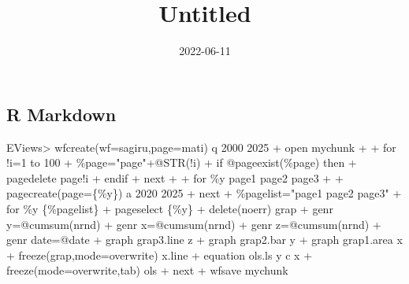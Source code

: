 \documentclass[
]{article}
\title{Untitled}
\author{}
\date{\vspace{-2.5em}2022-06-11}
\newenvironment{Shaded}{\begin{snugshade}}{\end{snugshade}}
\newcommand{\FunctionTok}[1]{\textcolor[rgb]{0.00,0.00,0.00}{#1}}
\newcommand{\NormalTok}[1]{#1}
\newcommand{\SpecialCharTok}[1]{\textcolor[rgb]{0.00,0.00,0.00}{#1}}
\begin{document}
\maketitle

{
\setcounter{tocdepth}{2}
\tableofcontents
}
\hypertarget{r-markdown}{%
\subsection{R Markdown}\label{r-markdown}}

\begin{Shaded}
\begin{Highlighting}[]
\NormalTok{EViews\textgreater{} wfcreate(wf=sagiru,page=mati) q 2000 2025}
\NormalTok{+ \textquotesingle{}open mychunk}
\NormalTok{+ }
\NormalTok{+ for !i=1 to 100}
\NormalTok{+ \%page="page"+@STR(!i)}
\NormalTok{+ if @pageexist(\%page) then}
\NormalTok{+ pagedelete page!i}
\NormalTok{+ endif}
\NormalTok{+ next}
\NormalTok{+ }
\NormalTok{+ for \%y page1 page2 page3  }
\NormalTok{+ }
\NormalTok{+ pagecreate(page=\{\%y\}) a 2020 2025}
\NormalTok{+ next}
\NormalTok{+ \%pagelist="page1 page2 page3"}
\NormalTok{+ for \%y \{\%pagelist\}}
\NormalTok{+ pageselect \{\%y\}}
\NormalTok{+ delete(noerr) grap}
\NormalTok{+ genr y=@cumsum(nrnd)}
\NormalTok{+ genr x=@cumsum(nrnd)}
\NormalTok{+ genr z=@cumsum(nrnd)}
\NormalTok{+ genr date=@date}
\NormalTok{+ \textquotesingle{}  graph grap3.line z   }
\NormalTok{+  \textquotesingle{}             graph grap2.bar y }
\NormalTok{+   \textquotesingle{}                        graph grap1.area x  }
\NormalTok{+    \textquotesingle{} freeze(grap,mode=overwrite) x.line}
\NormalTok{+ equation ols.ls y c x}
\NormalTok{+ freeze(mode=overwrite,tab) ols}
\NormalTok{+ next}
\NormalTok{+ \textquotesingle{}wfsave mychunk}
\end{Highlighting}
\end{Shaded}

\begin{Shaded}
\end{Shaded}
\end{document}
